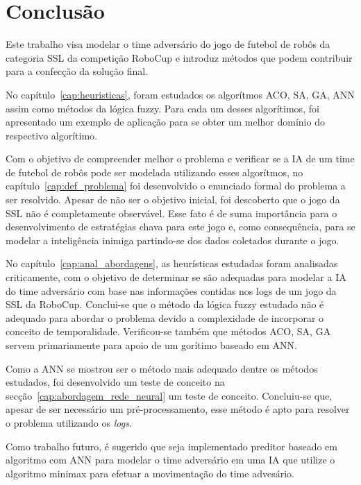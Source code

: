 \chapter{Conclusão}\label{cap:conclusao}

Este trabalho visa modelar o time adversário do jogo de futebol de robôs
da categoria SSL da competição RoboCup e introduz métodos que podem contribuir
para a confecção da solução final.

No capítulo~\ref{cap:heuristicas}, foram estudados os algorítmos ACO, SA, GA,
ANN assim como métodos da lógica fuzzy. Para cada um desses algorítimos, foi
apresentado
um exemplo de aplicação para se obter um melhor domínio do respectivo
algorítimo.

Com o objetivo de compreender melhor o problema e verificar se a IA de um time
de
futebol de robôs pode ser modelada utilizando esses algorítmos, no
capítulo~\ref{cap:def_problema} foi desenvolvido o enunciado formal do problema
a ser resolvido.
Apesar de não ser o objetivo inicial, foi descoberto que o jogo da SSL não é
completamente observável. Esse fato é de suma importância para o desenvolvimento
de estratégias chava para este jogo e, como consequência, para se modelar a
inteligência inimiga partindo-se dos dados coletados durante o jogo.

No capítulo~\ref{cap:anal_abordagens}, as heurísticas estudadas foram analisadas
criticamente, com o objetivo de determinar se são adequadas para modelar a IA
do time adversário com base nas informações contidas nos logs de um jogo da SSL
da RoboCup. Conclui-se que o método da lógica fuzzy estudado não é adequado para
abordar o problema devido a complexidade de incorporar o conceito de
temporalidade.
Verificou-se também que métodos ACO, SA, GA servem primariamente para apoio de
um
gorítimo baseado em ANN\@.

Como a ANN se mostrou ser o método mais adequado dentre os métodos estudados,
foi desenvolvido um teste de conceito na secção~\ref{cap:abordagem_rede_neural}
um teste de conceito. Concluiu-se que, apesar de ser necessário um
pré-processamento, esse
método é apto para resolver o problema utilizando os \textit{logs}.

Como trabalho futuro, é sugerido que seja implementado preditor baseado em
algoritmo com ANN para modelar o time adversário em uma IA que utilize o
algoritmo minimax
para efetuar a movimentação do time advesário.



